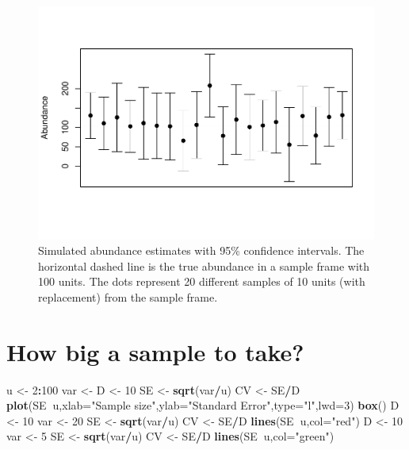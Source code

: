 \documentclass[]{book}
\newenvironment{Shaded}{\begin{snugshade}}{\end{snugshade}}
\newcommand{\DataTypeTok}[1]{\textcolor[rgb]{0.13,0.29,0.53}{#1}}
\newcommand{\DecValTok}[1]{\textcolor[rgb]{0.00,0.00,0.81}{#1}}
\newcommand{\KeywordTok}[1]{\textcolor[rgb]{0.13,0.29,0.53}{\textbf{#1}}}
\newcommand{\NormalTok}[1]{#1}
\newcommand{\OperatorTok}[1]{\textcolor[rgb]{0.81,0.36,0.00}{\textbf{#1}}}
\newcommand{\StringTok}[1]{\textcolor[rgb]{0.31,0.60,0.02}{#1}}
\theoremstyle{definition}
\theoremstyle{definition}
\theoremstyle{definition}
\theoremstyle{remark}
\begin{document}
\begin{figure}
\centering
\includegraphics{NRES450-LectureNotes_files/figure-latex/ciCoverage-1.pdf}
\caption{\label{fig:ciCoverage}Simulated abundance estimates with 95\%
confidence intervals. The horizontal dashed line is the true abundance
in a sample frame with 100 units. The dots represent 20 different
samples of 10 units (with replacement) from the sample frame.}
\end{figure}

\hypertarget{how-big-a-sample-to-take}{%
\section{How big a sample to take?}\label{how-big-a-sample-to-take}}

\begin{Shaded}
\begin{Highlighting}[]
\NormalTok{u <-}\StringTok{ }\DecValTok{2}\OperatorTok{:}\DecValTok{100}
\NormalTok{var <-}\StringTok{ }\NormalTok{D <-}\StringTok{ }\DecValTok{10}
\NormalTok{SE <-}\StringTok{ }\KeywordTok{sqrt}\NormalTok{(var}\OperatorTok{/}\NormalTok{u)}
\NormalTok{CV <-}\StringTok{ }\NormalTok{SE}\OperatorTok{/}\NormalTok{D}
\KeywordTok{plot}\NormalTok{(SE}\OperatorTok{~}\NormalTok{u,}\DataTypeTok{xlab=}\StringTok{"Sample size"}\NormalTok{,}\DataTypeTok{ylab=}\StringTok{"Standard Error"}\NormalTok{,}\DataTypeTok{type=}\StringTok{"l"}\NormalTok{,}\DataTypeTok{lwd=}\DecValTok{3}\NormalTok{)}
\KeywordTok{box}\NormalTok{()}
\NormalTok{D <-}\StringTok{ }\DecValTok{10}
\NormalTok{var <-}\StringTok{ }\DecValTok{20}
\NormalTok{SE <-}\StringTok{ }\KeywordTok{sqrt}\NormalTok{(var}\OperatorTok{/}\NormalTok{u)}
\NormalTok{CV <-}\StringTok{ }\NormalTok{SE}\OperatorTok{/}\NormalTok{D}
\KeywordTok{lines}\NormalTok{(SE}\OperatorTok{~}\NormalTok{u,}\DataTypeTok{col=}\StringTok{"red"}\NormalTok{)}
\NormalTok{D <-}\StringTok{ }\DecValTok{10}
\NormalTok{var <-}\StringTok{ }\DecValTok{5}
\NormalTok{SE <-}\StringTok{ }\KeywordTok{sqrt}\NormalTok{(var}\OperatorTok{/}\NormalTok{u)}
\NormalTok{CV <-}\StringTok{ }\NormalTok{SE}\OperatorTok{/}\NormalTok{D}
\KeywordTok{lines}\NormalTok{(SE}\OperatorTok{~}\NormalTok{u,}\DataTypeTok{col=}\StringTok{"green"}\NormalTok{)}
\end{Highlighting}
\end{Shaded}
\end{document}
